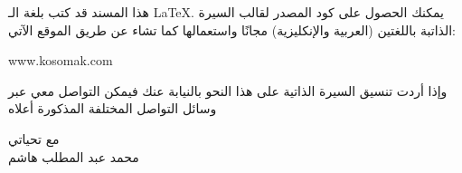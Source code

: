 \documentclass[12pt]{extarticle}
\begin{document}
\setlength{\parskip}{0cm}
%
%
\StopCensoring%
%
%
%
\sloppy%
%
\begin{paracol}{2}
\setlength\parindent{0pt}%
\setlength\parskip{0pt}%
\switchcolumn%


\switchcolumn


\switchcolumn*
{}%
\setcounter{lastnum}{\value{page}}%
\end{paracol}
\vfill
\begin{tcolorbox}[
enhanced,interior hidden,frame code={
	\path (frame.north west) to [ornament=88] (frame.north east);
},left skip=4cm,right skip=4cm,left=0pt,right=0pt,
]
\small
هذا المسند قد كتب بلغة الـ
\LaTeX.
يمكنك الحصول على كود المصدر لقالب السيرة الذاتبة باللغتين (العربية والإنكليزية) مجانًا
واستعمالها كما تشاء عن طريق الموقع الآتي:

\textenglish{{\selectfont www.kosomak.com}}

وإذا أردت تنسيق السيرة الذاتية على هذا النحو بالنيابة عنك فيمكن التواصل معي عبر وسائل التواصل المختلفة 
المذكورة أعلاه

\mbox{} \hfill \begin{varwidth}{5cm} \raggedright  مع تحياتي \\ محمد عبد المطلب هاشم \end{varwidth}
\end{tcolorbox}
\end{document}
